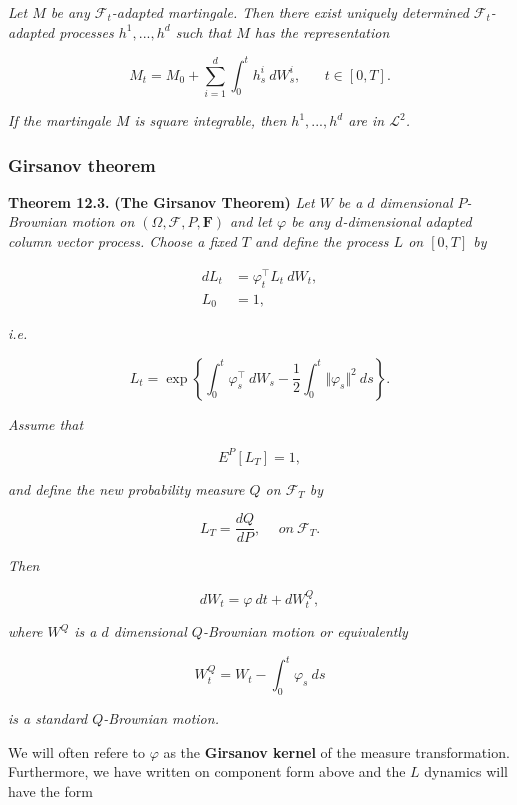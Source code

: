 \documentclass[
]{article}
\begin{document}
\emph{Let \(M\) be any \(\mathcal{F}_t\)-adapted martingale. Then there
exist uniquely determined \(\mathcal{F}_t\)-adapted processes
\(h^1,...,h^d\) such that \(M\) has the representation}

\[
M_t=M_0+\sum_{i=1}^d\int_0^t h_s^i\ dW_s^i,\hspace{20pt}t\in[0,T].\tag{12.9}
\]

\emph{If the martingale \(M\) is square integrable, then \(h^1,...,h^d\)
are in \(\mathcal{L}^2\).}

\hypertarget{girsanov-theorem}{%
\subsubsection{Girsanov theorem}\label{girsanov-theorem}}

\textbf{Theorem 12.3.} \textbf{(The Girsanov Theorem)} \emph{Let \(W\)
be a \(d\) dimensional \(P\)-Brownian motion on
\((\Omega,\mathcal{F},P,\mathbf{F})\) and let \(\varphi\) be any
\(d\)-dimensional adapted column vector process. Choose a fixed \(T\)
and define the process \(L\) on \([0,T]\) by}

\begin{align*}
dL_t&=\varphi^\top_t L_t\ dW_t,\tag{12.16}\\
L_0&=1,\tag{12.17}
\end{align*}

\emph{i.e.}

\[
L_t = \exp\left\{\int_0^t \varphi^\top_s\ dW_s - \frac{1}{2}\int_0^t \Vert\varphi_s\Vert ^2\ ds\right\}.
\]

\emph{Assume that}

\[
E^P[L_T]=1,\tag{12.18}
\]

\emph{and define the new probability measure \(Q\) on \(\mathcal{F}_T\)
by}

\[
L_T=\frac{dQ}{dP},\hspace{15pt}on\ \mathcal{F}_T.\tag{12.19}
\]

\emph{Then}

\[
dW_t=\varphi\ dt+dW_t^Q,\tag{12.20}
\]

\emph{where \(W^Q\) is a \(d\) dimensional \(Q\)-Brownian motion or
equivalently}

\[
W_t^Q=W_t-\int_0^t\varphi_s\ ds\tag{12.21}
\]

\emph{is a standard \(Q\)-Brownian motion.}

We will often refere to \(\varphi\) as the \textbf{Girsanov kernel} of
the measure transformation. Furthermore, we have written on component
form above and the \(L\) dynamics will have the form
\end{document}
